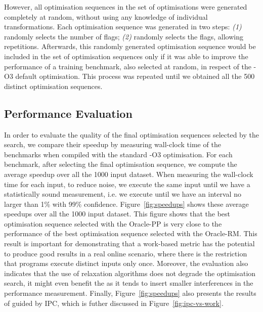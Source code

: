 However, all optimisation sequences in the set of optimisations were generated completely at random, without using any knowledge of individual transformations.
Each optimisation sequence was generated in two steps: \textit{(1)} randomly selects the number of flags; \textit{(2)} randomly selects the flags, allowing repetitions.
Afterwards, this randomly generated optimisation sequence would be included in the set of optimisation sequences only if it was able to improve the performance of a training benchmark, also selected at random, in respect of the {\flagstype -O3} default optimisation.
This process was repeated until we obtained all the 500 distinct optimisation sequences.

\subsection{Performance Evaluation}

In order to evaluate the quality of the final optimisation sequences selected by the {\itercomp} search, we compare their speedup by measuring wall-clock time of the benchmarks when compiled with the standard {\flagstype -O3} optimisation.
For each benchmark, after selecting the final optimisation sequence, we compute the average speedup over all the 1000 input dataset.
When measuring the wall-clock time for each input, to reduce noise, we execute the same input until we have a statistically sound measurement, i.e. we execute until we have an interval no larger than 1\% with 99\% confidence.
Figure~\ref{fig:speedups} shows these average speedups over all the 1000 input dataset.
This figure shows that the best optimisation sequence selected with the Oracle-PP is very close to the performance of the best optimisation sequence selected with the Oracle-RM.
This result is important for demonstrating that a work-based metric has the potential to produce good results in a real online scenario, where there is the restriction that programs execute distinct inputs only once.
Moreover, the evaluation also indicates that the use of relaxation algorithms does not degrade the optimisation search,
it might even benefit the {\itercomp} as it tends to insert smaller interferences in the performance measurement.
Finally, Figure~\ref{fig:speedups} also presents the results of {\itercomp} guided by IPC, which is futher discussed in Figure~\ref{fig:ipc-vs-work}.

